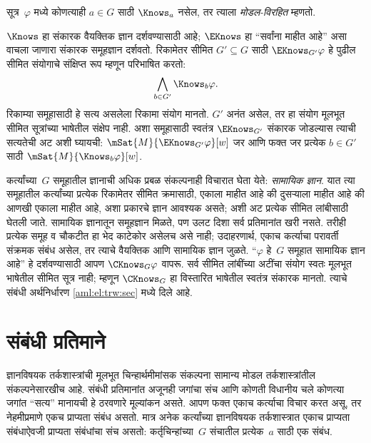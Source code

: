 सूत्र~$\varphi$ मध्ये कोणत्याही $a\in G$ साठी
$\Knows_a$ नसेल, तर त्याला \emph{मोडल-विरहित} म्हणतो.
\begin{defn}
  $\Knows$ हा संकारक वैयक्तिक ज्ञान दर्शवण्यासाठी
  आहे; $\EKnows$ हा ``सर्वांना माहीत आहे'' असा
  वाचला जाणारा संकारक समूहज्ञान दर्शवतो. रिकामेतर
  सीमित $G' \subseteq G$ साठी $\EKnows_{G'} \varphi$ हे
  पुढील सीमित संयोगाचे संक्षिप्त रूप म्हणून परिभाषित करतो:
  \[\bigwedge_{b \in G'} \Knows_b \varphi.\]
  रिकाम्या समूहासाठी हे सत्य असलेला रिकामा संयोग मानतो.
  $G'$ अनंत असेल, तर हा संयोग मूलभूत सीमित सूत्रांच्या भाषेतील
  संक्षेप नाही. अशा समूहासाठी स्वतंत्र $\EKnows_{G'}$
  संकारक जोडल्यास त्याची सत्यतेची अट अशी घ्यायची:
  $\mSat{M}{\EKnows_{G'} \varphi}[w]$ जर आणि फक्त जर
  प्रत्येक $b\in G'$ साठी $\mSat{M}{\Knows_b \varphi}[w]$.
\end{defn}

कर्त्यांच्या~$G$ समूहातील ज्ञानाची अधिक प्रबळ
संकल्पनाही विचारात घेता येते: \emph{सामायिक ज्ञान}.
यात त्या समूहातील कर्त्यांच्या प्रत्येक रिकामेतर सीमित
क्रमासाठी, एकाला माहीत आहे की दुसऱ्याला माहीत आहे की
आणखी एकाला माहीत आहे, अशा प्रकारचे ज्ञान आवश्यक असते;
अशी अट प्रत्येक सीमित लांबीसाठी घेतली जाते.
सामायिक ज्ञानातून समूहज्ञान मिळते, पण उलट दिशा सर्व
प्रतिमानांत खरी नसते. तरीही प्रत्येक समूह व चौकटीत
हा भेद काटेकोर असेलच असे नाही; उदाहरणार्थ, एकाच
कर्त्याचा परावर्ती संक्रमक संबंध असेल, तर त्याचे
वैयक्तिक आणि सामायिक ज्ञान जुळते.
``$\varphi$ हे~$G$ समूहात सामायिक ज्ञान आहे'' हे
दर्शवण्यासाठी आपण $\CKnows_G \varphi$ वापरू. सर्व सीमित
लांबींच्या अटींचा संयोग स्वतः मूलभूत भाषेतील सीमित
सूत्र नाही; म्हणून $\CKnows_G$ हा विस्तारित भाषेतील
स्वतंत्र संकारक मानतो. त्याचे संबंधी अर्थनिर्धारण
\ref{aml:el:trw:sec} मध्ये दिले आहे.













\section{संबंधी प्रतिमाने}\label{aml:el:rel:sec}

ज्ञानविषयक तर्कशास्त्रांची मूलभूत चिन्हार्थमीमांसक
संकल्पना सामान्य मोडल तर्कशास्त्रांतील संकल्पनेसारखीच
आहे. संबंधी प्रतिमानांत अजूनही जगांचा संच आणि कोणती
विधानीय चले कोणत्या जगांत ``सत्य''
मानायची हे ठरवणारे मूल्यांकन असते. आपण फक्त एकाच
कर्त्याचा विचार करत असू, तर नेहमीप्रमाणे एकच
प्राप्यता संबंध असतो. मात्र अनेक कर्त्यांच्या ज्ञानविषयक
तर्कशास्त्रात एकाच प्राप्यता संबंधाऐवजी प्राप्यता
संबंधांचा संच असतो: कर्तृचिन्हांच्या~$G$ संचातील
प्रत्येक~$a$ साठी एक संबंध.

